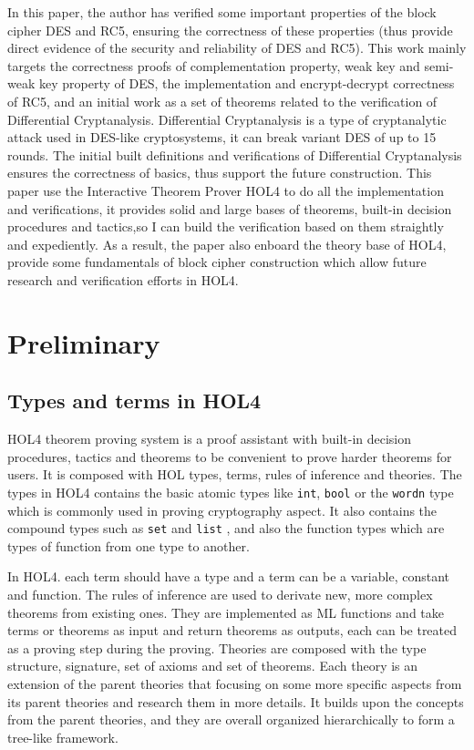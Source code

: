 \documentclass{article}
\begin{document}
In this paper, the author has verified some important properties
of the block cipher DES and RC5, ensuring the correctness of these
properties (thus provide
direct evidence of the security and reliability of DES and RC5).
This work mainly targets the correctness proofs of complementation property,
weak key and semi-weak key property of DES, the implementation and
encrypt-decrypt correctness of RC5, and an initial work as a set of
theorems related to the verification
of Differential Cryptanalysis. Differential Cryptanalysis is a type of cryptanalytic attack used in DES-like
cryptosystems, it can break variant DES of up to 15 rounds. The initial built definitions and verifications of
Differential Cryptanalysis ensures the correctness of basics, thus support the future construction. This paper
use the Interactive Theorem Prover HOL4 to do all the implementation and verifications, it provides solid and
large bases of theorems, built-in decision procedures and tactics,so I can build the verification based on them
straightly and expediently. As a result, the paper also enboard the theory base of HOL4, provide some
fundamentals of block cipher construction which allow future research and verification efforts in HOL4.

\section{Preliminary}

\subsection{Types and terms in HOL4}
HOL4 theorem proving system is a proof assistant with built-in decision procedures, tactics and theorems to
be convenient to prove harder theorems for users. It is composed with HOL types, terms, rules of inference
and theories. The types in HOL4 contains the basic atomic types like \verb|int|, \verb|bool| or the \verb|wordn| type which
is commonly used in proving cryptography aspect. It also contains the compound types such as \verb|set| and \verb|list|
, and also the function types which are types of function from one type to another.

In HOL4. each term should
have a type and a term can be a variable, constant and function. The rules of inference are used to derivate
new, more complex theorems from existing ones. They are implemented as ML functions and take terms or theorems
as input and return theorems as outputs, each can be treated as a proving step during the proving. Theories are
composed with the type structure, signature, set of axioms and set of theorems. Each theory is an extension of
the parent theories that focusing on some more specific aspects from its parent theories and research them in
more details. It builds upon the concepts from the parent theories, and they are overall organized hierarchically
to form a tree-like framework.
\end{document}
